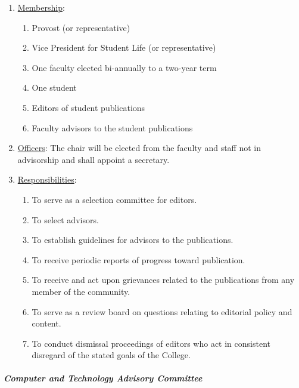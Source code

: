 					\begin{enumerate}[label=\alph*)]
						\item{\underline{Membership}:
							\begin{enumerate}[label=\arabic*)]
								\item{Provost (or representative)}
								\item{Vice President for Student Life (or representative)}
								\item{One faculty elected bi-annually to a two-year term}
								\item{One student}
								\item{Editors of student publications}
								\item{Faculty advisors to the student publications}
							\end{enumerate}
						}
						\item{\underline{Officers}:
							The chair will be elected from the faculty and staff not in advisorship and shall appoint a secretary.
						}
						\item{\underline{Responsibilities}:
							\begin{enumerate}[label=\arabic*)]
								\item{To serve as a selection committee for editors.}
								\item{To select advisors.}
								\item{To establish guidelines for advisors to the publications.}
								\item{To receive periodic reports of progress toward publication.}
								\item{To receive and act upon grievances related to the publications from any member of the community.}
								\item{To serve as a review board on questions relating to editorial policy and content.}
								\item{To conduct dismissal proceedings of editors who act in consistent disregard of the stated goals of the College.}
							\end{enumerate}
						}
					\end{enumerate}
				\subparagraph{Computer and Technology Advisory Committee}
